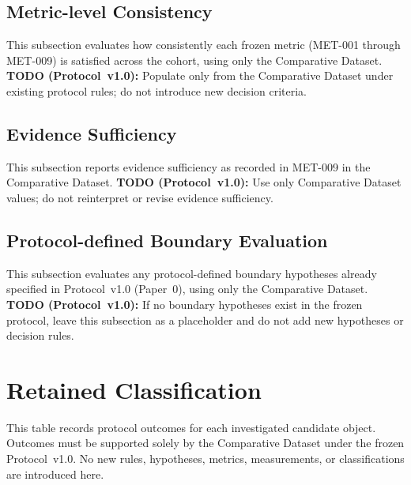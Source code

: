 \documentclass{article}
\begin{document}
\subsection*{Metric-level Consistency}
This subsection evaluates how consistently each frozen metric (MET-001 through MET-009) is satisfied across the cohort, using only the Comparative Dataset. \textbf{TODO (Protocol~v1.0):} Populate only from the Comparative Dataset under existing protocol rules; do not introduce new decision criteria.

\subsection*{Evidence Sufficiency}
This subsection reports evidence sufficiency as recorded in MET-009 in the Comparative Dataset. \textbf{TODO (Protocol~v1.0):} Use only Comparative Dataset values; do not reinterpret or revise evidence sufficiency.

\subsection*{Protocol-defined Boundary Evaluation}
This subsection evaluates any protocol-defined boundary hypotheses already specified in Protocol~v1.0 (Paper~0), using only the Comparative Dataset. \textbf{TODO (Protocol~v1.0):} If no boundary hypotheses exist in the frozen protocol, leave this subsection as a placeholder and do not add new hypotheses or decision rules.

\section*{Retained Classification}

This table records protocol outcomes for each investigated candidate object. Outcomes must be supported solely by the Comparative Dataset under the frozen Protocol~v1.0. No new rules, hypotheses, metrics, measurements, or classifications are introduced here.
\end{document}
